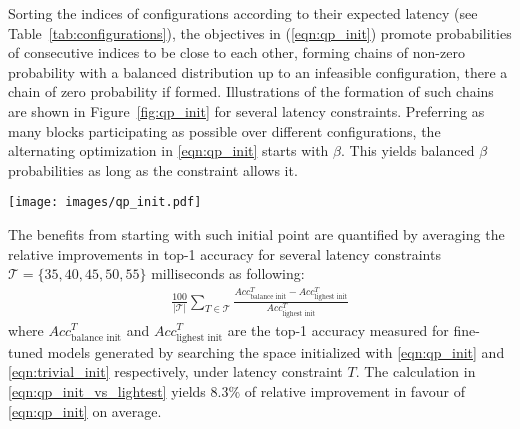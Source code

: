 \documentclass[dvipsnames,table,xcdraw]{article}
\begin{document}
Sorting the indices of configurations according to their expected latency (see Table~\ref{tab:configurations}), the objectives in (\ref{eqn:qp_init}) promote probabilities of consecutive indices to be close to each other, forming chains of non-zero probability with a balanced distribution up to an infeasible configuration, there a chain of zero probability if formed. Illustrations of the formation of such chains are shown in Figure~\ref{fig:qp_init} for several latency constraints. Preferring as many blocks participating as possible over different configurations, the alternating optimization in \eqref{eqn:qp_init} starts with $\beta$. This yields balanced $\beta$ probabilities as long as the constraint allows it. \begin{figure*}[htb]
    \centering
\texttt{[image: images/qp\_init.pdf]}
    \caption{Heat maps representing the initial probability of picking each stage depth (top) and block configuration (bottom), sorted from the lightest to the heaviest (Table~\ref{tab:configurations}). Each couple of frames shows the initial point for a different latency constraint. Rows in each frames stand for different stages (top) and blocks (bottom). The lightest feasible initial point \eqref{eqn:trivial_init} involves only a single configuration of the first block in each stage, avoiding gradients from propagating to others (left). The balanced initial points \eqref{eqn:qp_init} form chains of similar non-zero probability followed by chains of zero probabilities, such that gradients are propagated through feasible paths with a balanced distribution.}
    \label{fig:qp_init}
    \vspace{15mm}
\end{figure*}


The benefits from starting with such initial point are quantified by averaging the relative improvements in top-1 accuracy for several latency constraints $\mathcal{T}=\{35, 40, 45, 50, 55\}$ milliseconds as following:
\begin{align}
\label{eqn:qp_init_vs_lightest}
\frac{100}{|\mathcal{T}|} \sum_{T\in\mathcal{T}} \frac{Acc^T_{\text{balance init}} - Acc^T_{\text{lighest init}}}{Acc^T_{\text{lighest init}}}
\end{align}
where $Acc^T_{\text{balance init}}$ and $Acc^T_{\text{lighest init}}$ are the top-1 accuracy measured for fine-tuned models generated by searching the space initialized with \eqref{eqn:qp_init} and \eqref{eqn:trivial_init} respectively, under latency constraint $T$.
The calculation in \eqref{eqn:qp_init_vs_lightest} yields $8.3\%$ of relative improvement in favour of \eqref{eqn:qp_init} on average.
\end{document}

